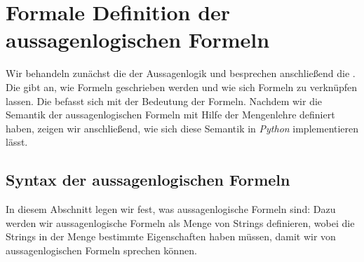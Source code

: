 \section{Formale Definition der aussagenlogischen Formeln}
Wir behandeln zunächst die  der Aussagenlogik und besprechen anschließend die
.  Die  gibt an, wie Formeln geschrieben werden und wie sich Formeln zu
 verknüpfen lassen.  Die  befasst sich mit der Bedeutung der Formeln.
Nachdem wir die Semantik der aussagenlogischen Formeln mit Hilfe der Mengenlehre definiert haben, zeigen wir
anschließend, wie sich diese Semantik in \textsl{Python} implementieren lässt.

\subsection{Syntax der aussagenlogischen Formeln}
In diesem Abschnitt legen wir fest, was aussagenlogische Formeln sind:  Dazu werden wir aussagenlogische
Formeln als Menge von Strings definieren, wobei die Strings in der Menge bestimmte Eigenschaften haben müssen,
damit wir von aussagenlogischen Formeln sprechen können.

